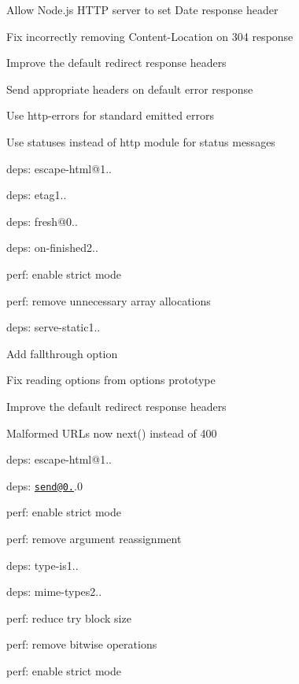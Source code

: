 \begin{DoxyItemize}
{\begin{DoxyItemize}
\item Allow Node.\+js H\+T\+TP server to set {\ttfamily Date} response header
\item Fix incorrectly removing {\ttfamily Content-\/\+Location} on 304 response
\item Improve the default redirect response headers
\item Send appropriate headers on default error response
\item Use {\ttfamily http-\/errors} for standard emitted errors
\item Use {\ttfamily statuses} instead of {\ttfamily http} module for status messages
\item deps\+: escape-\/html@1..
\item deps\+: etag1..
\item deps\+: fresh@0..
\item deps\+: on-\/finished2..
\item perf\+: enable strict mode
\item perf\+: remove unnecessary array allocations
\end{DoxyItemize}}
\item {\ttfamily deps\+: serve-\/static1..
\begin{DoxyItemize}
\item Add {\ttfamily fallthrough} option
\item Fix reading options from options prototype
\item Improve the default redirect response headers
\item Malformed U\+R\+Ls now {\ttfamily next()} instead of 400
\item deps\+: escape-\/html@1..
\item deps\+: \href{mailto:send@0.13}{\tt send@0.}.0
\item perf\+: enable strict mode
\item perf\+: remove argument reassignment
\end{DoxyItemize}}
\item {\ttfamily deps\+: type-\/is1..
\begin{DoxyItemize}
\item deps\+: mime-\/types2..
\item perf\+: reduce try block size
\item perf\+: remove bitwise operations
\end{DoxyItemize}}
\item {\ttfamily perf\+: enable strict mode}

\end{DoxyItemize}
